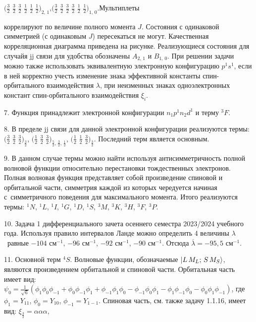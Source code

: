 \vspace{-\parskip+1mm}
$\Big( \frac32\,\,\frac32\,\,\frac32\,\,\frac12\,\,\frac12\,\,\frac12 \Big)_{2,\,1}$,\hspace{\fill}$\Big( \frac32\,\,\frac32\,\,\frac32\,\,\frac32\,\,\frac12\,\,\frac12 \Big)_{1,\,0}$.\hspace{\fill}Мультиплеты\par
\vspace{-\parskip+1mm}
коррелируют по величине полного момента $J$. Состояния с одинаковой симметрией (с одинаковым $J$) пересекаться не могут. Качественная корреляционная диаграмма приведена на рисунке. Реализующиеся состояния для случайя jj связи для удобства обозначены $A_{2,\,1}$ и $B_{1,\,0}$. При решении задачи можно также использовать эквивалентную электронную конфигурацию $p^1s^1$, если в ней корректно учесть изменение знака эффективной константы спин-орбитального взаимодействия $\lambda$, при неизменных знаках одноэлектронных констант спин-орбитального взаимодействия $\xi_i$. \par
7. Функция принадлежит электронной конфигурации $n_1p^1n_2d^1$ и терму $^3F$.\par
8. В пределе jj связи для данной электронной конфигурации реализуются термы: $\Big( \frac32\,\,\frac32\,\,\frac32 \Big)_{\frac32}$, $\Big( \frac12\,\,\frac32\,\,\frac32 \Big)_{\frac52,\,\frac32,\,\frac12}$, $\Big( \frac12\,\,\frac12\,\,\frac32 \Big)_{\frac32}$. Последний терм является основным.\par
9. В данном случае термы можно найти используя антисимметричность полной волновой функции относительно перестановки тождественных электронов. Полная волновая функция представляет собой произведение спиновой и орбитальной части, симметрия каждой из которых чередуется начиная с~симметричного поведения для максимального момента. Итого реализуются термы: $^1N$, $^1L$, $^1I$, $^1G$, $^1D$, $^1S$, $^3M$, $^3K$, $^3H$, $^3F$, $^3P$.\par
10. Задача 1 дифференциального зачета осеннего семестра 2023/2024 учебного года. Используя правило интервалов Ланде можно определить 4 величины $\lambda$~равные $-104$ см$^{-1}$, $-96$ см$^{-1}$, $-92$ см$^{-1}$, $-90$ см$^{-1}$. Отсюда $\overline \lambda = -95,5$ см$^{-1}$.\par
11. Основной терм $^4S$. Волновые функции, обозначаемые $\ket{L\,M_L;\,S\,M_S}$, являются произведением орбитальной и спиновой части. Орбитальная часть имеет вид: $\psi_0=\frac{1}{\sqrt6}(\phi_1\phi_0\phi_{-1} + \phi_0\phi_{-1}\phi_{1} + \phi_{-1}\phi_1\phi_{0} - \phi_{-1}\phi_0\phi_{1} - \phi_1\phi_{-1}\phi_{0} - \phi_0\phi_1\phi_{-1} )$, где $\phi_1 = \textit{Y}_{11}$, $\phi_0 = \textit{Y}_{10}$, $\phi_{-1} = \textit{Y}_{1-1}$. Спиновая часть, см. также задачу 1.1.16, имеет вид: $\xi_{\frac32}=\alpha \alpha \alpha$, \par

